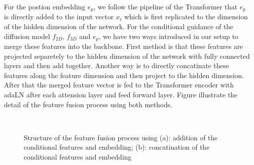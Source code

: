 \documentclass[12pt,DIV14,BCOR12mm,a4paper,footinclude=false,headinclude,parskip=half-,twoside,openright,cleardoublepage=empty,toc=index,bibliography=totoc,listof=totoc]{scrreprt}
\numberwithin{equation}{chapter}
\begin{document}
For the postion embedding $e_{p}$, we follow the pipeline of the Transformer that $e_{p}$ is directly added to the input vector $x_{t}$ which is first replicated to the dimension of the hidden dimension of the network. For the conditional guidance of the diffusion model $f_{2D}$, $f_{3D}$ and $e_{p}$, we have two ways introduced in our setup to merge these features into the backbone. First method is that these features are projected separetely to the hidden dimension of the network with fully connected layers and then add together. Another way is to directly concatinate these features along the feature dimension and then project to the hidden dimension. After that the merged feature vector is fed to the Transformer encoder with adaLN after each attension layer and feed forward layer. Figure illustrate the detail of the feature fusion process using both methods.
\begin{figure}[h]
  \centering
   \\
  \centering
  \caption{Structure of the feature fusion process using (a): addition of the conditional features and embedding; (b): concatination of the conditional features and embedding}
  \label{img:fuse}
\end{figure}
\end{document}

